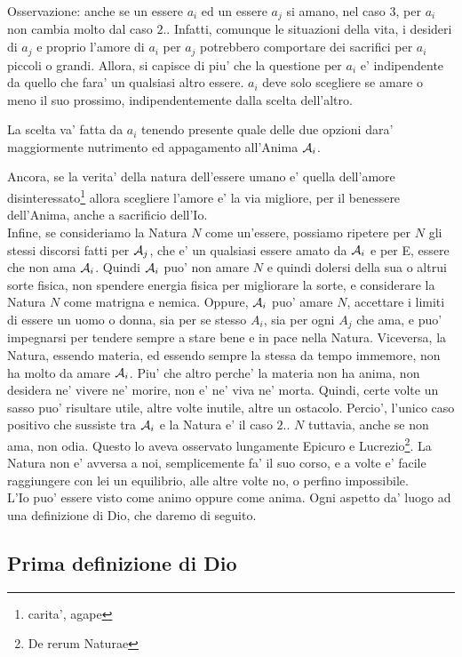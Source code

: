 Osservazione: anche se un essere $a_i$ ed un essere $a_j$ si amano, nel caso $3$, per $a_i$ non cambia molto dal caso $2.$. Infatti, comunque le situazioni della vita, i desideri di $a_j$ e proprio l'amore di $a_i$ per $a_j$ potrebbero comportare dei sacrifici per $a_i$ piccoli o grandi. Allora, si capisce di piu' che la questione per $a_i$ e' indipendente da quello che fara' un qualsiasi altro essere. $a_i$ deve solo scegliere se amare o meno il suo prossimo, indipendentemente dalla scelta dell'altro.

La scelta va' fatta da $a_i$ tenendo presente quale delle due opzioni dara' maggiormente nutrimento ed appagamento all'Anima $\mathcal{A}_i$. 

Ancora, se la verita' della natura dell'essere umano e' quella dell'amore disinteressato\footnote{carita', agape} allora scegliere l'amore e' la via migliore, per il benessere dell'Anima, anche a sacrificio dell'Io. \\

Infine, se consideriamo la Natura $N$ come un'essere, possiamo ripetere per $N$ gli stessi discorsi fatti per $\mathcal{A}_j$, che e' un qualsiasi essere amato da $\mathcal{A}_i$ e per E, essere che non ama $\mathcal{A}_i$. Quindi $\mathcal{A}_i$ puo' non amare $N$ e quindi dolersi della sua o altrui sorte fisica, non spendere energia fisica per migliorare la sorte, e considerare la Natura $N$ come matrigna e nemica. Oppure, $\mathcal{A}_i$ puo' amare $N$, accettare i limiti di essere un uomo o donna, sia per se stesso $A_i$, sia per ogni $A_j$ che ama, e puo' impegnarsi per tendere sempre a stare bene e in pace nella Natura. Viceversa, la Natura, essendo materia, ed essendo sempre la stessa da tempo immemore, non ha molto da amare $\mathcal{A}_i$. Piu' che altro perche' la materia non ha anima, non desidera ne' vivere ne' morire, non e' ne' viva ne' morta. Quindi, certe volte un sasso puo' risultare utile, altre volte inutile, altre un ostacolo. Percio', l'unico caso positivo che sussiste tra $\mathcal{A}_i$ e la Natura e' il caso $2.$. $N$ tuttavia, anche se non ama, non odia. Questo lo aveva osservato lungamente Epicuro e Lucrezio\footnote{De rerum Naturae}. La Natura non e' avversa a noi, semplicemente fa' il suo corso, e a volte e' facile raggiungere con lei un equilibrio, alle altre volte no, o perfino impossibile. \\

L'Io puo' essere visto come animo oppure come anima. Ogni aspetto da' luogo ad una definizione di Dio, che daremo di seguito.

\subsection{Prima definizione di Dio}
\label{DioComeSpirito}


